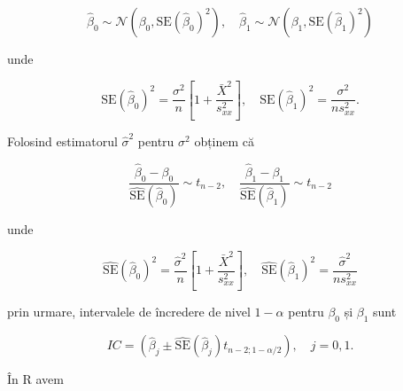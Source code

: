 \documentclass[]{article}
\begin{document}
\[
\hat\beta_0\sim\mathcal{N}\left(\beta_0,\mathrm{SE}(\hat\beta_0)^2\right),\quad\hat\beta_1\sim\mathcal{N}\left(\beta_1,\mathrm{SE}(\hat\beta_1)^2\right)
\]

unde

\[
\mathrm{SE}(\hat\beta_0)^2=\frac{\sigma^2}{n}\left[1+\frac{\bar X^2}{s_{xx}^2}\right],\quad \mathrm{SE}(\hat\beta_1)^2=\frac{\sigma^2}{ns_{xx}^2}.
\]

Folosind estimatorul \(\hat\sigma^2\) pentru \(\sigma^2\) obținem că

\[
\frac{\hat\beta_0-\beta_0}{\hat{\mathrm{SE}}(\hat\beta_0)}\sim t_{n-2},\quad\frac{\hat\beta_1-\beta_1}{\hat{\mathrm{SE}}(\hat\beta_1)}\sim t_{n-2}
\]

unde

\[
\hat{\mathrm{SE}}(\hat\beta_0)^2=\frac{\hat\sigma^2}{n}\left[1+\frac{\bar X^2}{s_{xx}^2}\right],\quad \hat{\mathrm{SE}}(\hat\beta_1)^2=\frac{\hat\sigma^2}{ns_{xx}^2}
\]

prin urmare, intervalele de încredere de nivel \(1-\alpha\) pentru
\(\beta_0\) și \(\beta_1\) sunt

\[
IC = \left(\hat\beta_j\pm\hat{\mathrm{SE}}(\hat\beta_j)t_{n-2;1-\alpha/2}\right),\quad j=0,1.
\]

În R avem
\end{document}
